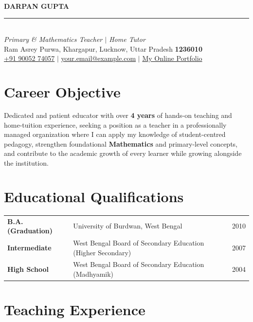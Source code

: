 \documentclass[10pt,a4paper]{article}
\begin{document}
\begin{center}
  {\LARGE\bfseries\color{primary} DARPAN GUPTA}\\[2pt]
  {\color{accent}\rule{0.35\textwidth}{1pt}}\\[3pt]
  {\normalsize\itshape Primary \& Mathematics Teacher $\vert$ Home Tutor}\\[3pt]
  Ram Asrey Purwa, Khargapur, Lucknow, Uttar Pradesh \textbf{1236010}\\[1pt]
  \href{tel:+919005274057}{+91 90052 74057} \quad$\vert$\quad
  \href{mailto:your.email@example.com}{your.email@example.com} \quad$\vert$\quad
  \href{https://YOUR-PORTFOLIO-LINK-HERE}{My Online Portfolio}
\end{center}
\vspace{-10pt}

\section{Career Objective}
Dedicated and patient educator with over \textbf{4 years} of hands-on teaching and
home-tuition experience, seeking a position as a teacher in a professionally managed
organization where I can apply my knowledge of student-centred pedagogy, strengthen
foundational \textbf{Mathematics} and primary-level concepts, and contribute to the
academic growth of every learner while growing alongside the institution.

\section{Educational Qualifications}
\begin{tabularx}{\textwidth}{@{}l X l@{}}
\textbf{B.A. (Graduation)} & University of Burdwan, West Bengal & 2010 \\
\textbf{Intermediate} & West Bengal Board of Secondary Education (Higher Secondary) & 2007 \\
\textbf{High School} & West Bengal Board of Secondary Education (Madhyamik) & 2004 \\
\end{tabularx}

\section{Teaching Experience}
\end{document}
